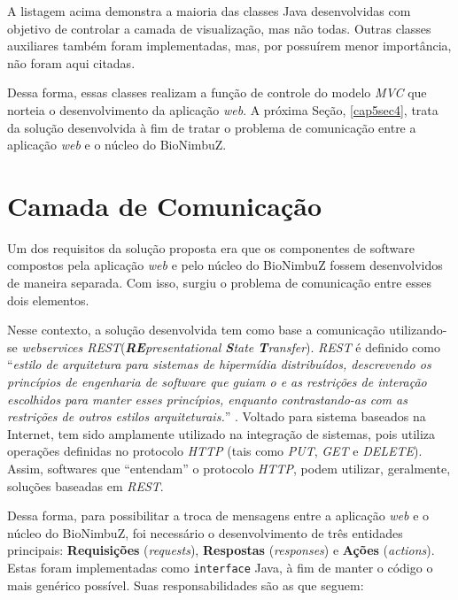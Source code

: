 A listagem acima demonstra a maioria das classes Java desenvolvidas com objetivo de controlar a camada de visualização, mas não todas. Outras classes auxiliares também foram implementadas, mas, por possuírem menor importância, não foram aqui citadas.

Dessa forma, essas classes realizam a função de controle do modelo \textit{MVC} que norteia o desenvolvimento da aplicação \textit{web}. A próxima Seção, \ref{cap5sec4}, trata da solução desenvolvida à fim de tratar o problema de comunicação entre a aplicação \textit{web} e o núcleo do BioNimbuZ.



\section{Camada de Comunicação} \label{cap5sec5}

Um dos requisitos da solução proposta era que os componentes de software compostos pela aplicação \textit{web} e pelo núcleo do BioNimbuZ fossem desenvolvidos de maneira separada. Com isso, surgiu o problema de comunicação entre esses dois elementos.

Nesse contexto, a solução desenvolvida tem como base a comunicação utilizando-se \textit{webservices REST}(\textit{\textbf{RE}presentational \textbf{S}tate \textbf{T}ransfer}). \textit{REST} é definido como ``\textit{estilo de arquitetura para sistemas de hipermídia distribuídos, descrevendo os princípios de engenharia de software que guiam o e as restrições de interação escolhidos para manter esses princípios, enquanto contrastando-as com as restrições de outros estilos arquiteturais.}'' \cite{rest}. Voltado para sistema baseados na Internet, tem sido amplamente utilizado na integração de sistemas, pois utiliza operações definidas no protocolo \textit{HTTP} (tais como \textit{PUT}, \textit{GET} e \textit{DELETE}). Assim, softwares que ``entendam'' o protocolo \textit{HTTP}, podem utilizar, geralmente, soluções baseadas em \textit{REST}.

Dessa forma, para possibilitar a troca de mensagens entre a aplicação \textit{web} e o núcleo do BioNimbuZ, foi necessário o desenvolvimento de três entidades principais: \textbf{Requisições} (\textit{requests}), \textbf{Respostas} (\textit{responses}) e \textbf{Ações} (\textit{actions}). Estas foram implementadas como \texttt{interface} Java, à fim de manter o código o mais genérico possível. Suas responsabilidades são as que seguem:

